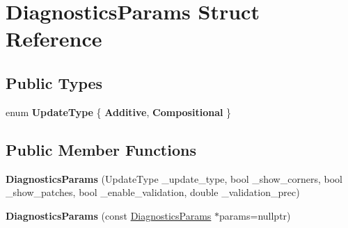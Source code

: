 \hypertarget{structDiagnosticsParams}{\section{Diagnostics\-Params Struct Reference}
\label{structDiagnosticsParams}
}
\subsection*{Public Types}
\begin{DoxyCompactItemize}
\item 
enum {\bfseries Update\-Type} \{ {\bfseries Additive}, 
{\bfseries Compositional}
 \}
\end{DoxyCompactItemize}
\subsection*{Public Member Functions}
\begin{DoxyCompactItemize}
\item 
\hypertarget{structDiagnosticsParams_ab36a7e885f3961c0469b5f53f0cc1203}{{\bfseries Diagnostics\-Params} (Update\-Type \-\_\-update\-\_\-type, bool \-\_\-show\-\_\-corners, bool \-\_\-show\-\_\-patches, bool \-\_\-enable\-\_\-validation, double \-\_\-validation\-\_\-prec)}\label{structDiagnosticsParams_ab36a7e885f3961c0469b5f53f0cc1203}

\item 
\hypertarget{structDiagnosticsParams_a41a0eda527e1e2e523dced1f3820b2e8}{{\bfseries Diagnostics\-Params} (const \hyperlink{structDiagnosticsParams}{Diagnostics\-Params} $\ast$params=nullptr)}\label{structDiagnosticsParams_a41a0eda527e1e2e523dced1f3820b2e8}

\end{DoxyCompactItemize}
